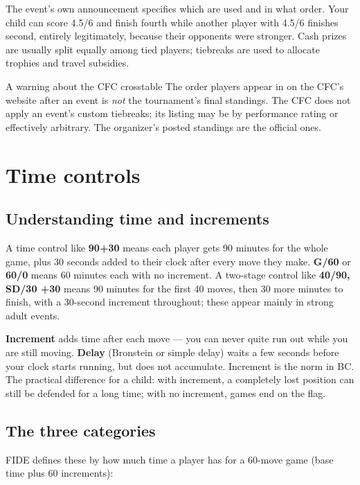 \documentclass[10pt,letterpaper]{article}
\newcommand{\term}[1]{\textbf{#1}}
\begin{document}
The event's own announcement specifies which are used and in what order. Your
child can score 4.5/6 and finish fourth while another player with 4.5/6 finishes
second, entirely legitimately, because their opponents were stronger. Cash
prizes are usually split equally among tied players; tiebreaks are used to
allocate trophies and travel subsidies.

\begin{keybox}{A warning about the CFC crosstable}
The order players appear in on the CFC's website after an event is \emph{not}
the tournament's final standings. The CFC does not apply an event's custom
tiebreaks; its listing may be by performance rating or effectively arbitrary.
The organizer's posted standings are the official ones.
\end{keybox}

\section{Time controls}

\subsection{Understanding time and increments}

A time control like \textbf{90+30} means each player gets 90 minutes for the
whole game, plus 30 seconds added to their clock after every move they make.
\textbf{G/60} or \textbf{60/0} means 60 minutes each with no increment. A
two-stage control like \textbf{40/90, SD/30 +30} means 90 minutes for the first
40 moves, then 30 more minutes to finish, with a 30-second increment throughout;
these appear mainly in strong adult events.

\term{Increment} adds time after each move --- you can never quite run out while
you are still moving. \term{Delay} (Bronstein or simple delay) waits a few
seconds before your clock starts running, but does not accumulate. Increment is
the norm in BC. The practical difference for a child: with increment, a
completely lost position can still be defended for a long time; with no
increment, games end on the flag.

\subsection{The three categories}

FIDE defines these by how much time a player has for a 60-move game (base time
plus 60 increments):
\end{document}
